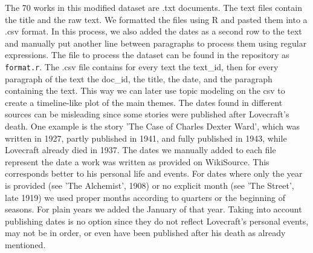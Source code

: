 The 70 works in this modified dataset are .txt documents. The text files contain the title and 
the raw text. We formatted the files using R and pasted them into a .csv format. In this process, 
we also added the dates as a second row to the text and manually put another line between 
paragraphs to process them using regular expressions. The file to process the dataset can be 
found in the repository as \texttt{format.r}. The .csv file contains for every text the text\_id, then 
for every paragraph of the text the doc\_id, the title, the date, and the paragraph containing 
the text. This way we can later use topic modeling on the csv to create a timeline-like plot of 
the main themes. The dates found in different sources can be misleading since some stories were 
published after Lovecraft's death. One example is the story 'The Case of Charles Dexter Ward', 
which was written in 1927, partly published in 1941, and fully published in 1943, while Lovecraft 
already died in 1937. The dates we manually added to each file represent the date a work was 
written as provided on WikiSource. This corresponds better to his personal life and events. For 
dates where only the year is provided (see 'The Alchemist', 1908) or no explicit month 
(see 'The Street', late 1919) we used proper months according to quarters or the beginning of 
seasons. For plain years we added the January of that year. Taking into account publishing dates 
is no option since they do not reflect Lovecraft's personal events, may not be in order, or even 
have been published after his death as already mentioned.